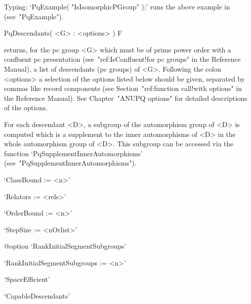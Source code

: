 Typing: `PqExample( "IsIsomorphicPGroup" );' runs the  above  example  in
{\GAP} (see~"PqExample").


\>PqDescendants( <G> : <options> ) F

returns, for the pc group <G> which must be of prime power order  with  a
confluent pc presentation (see~"ref:IsConfluent!for  pc  groups"  in  the
{\GAP} Reference Manual), a list  of  descendants  (pc  groups)  of  <G>.
Following the colon <options> a selection of  the  options  listed  below
should  be  given,  separated  by  commas  like  record  components  (see
Section~"ref:function call!with options" in the {\GAP} Reference Manual).
See Chapter~"ANUPQ options" for detailed descriptions of the options.

For each descendant <D>, a subgroup of the automorphism group  of <D>  is
computed which is  a supplement to the inner automorphisms  of <D> in the
whole automorphism group  of <D>.  This subgroup can  be accessed via the
function                                 `PqSupplementInnerAutomorphisms'
(see~"PqSupplementInnerAutomorphisms").

\beginlist%

\item{}`ClassBound := <n>'

\item{}`Relators := <rels>'

\item{}`OrderBound := <n>'

\item{}`StepSize := <nOrlist>'

%
{@option \noexpand`RankInitialSegmentSubgroups'}
\item{}`RankInitialSegmentSubgroups := <n>'

\item{}`SpaceEfficient'

\item{}`CapableDescendants'

